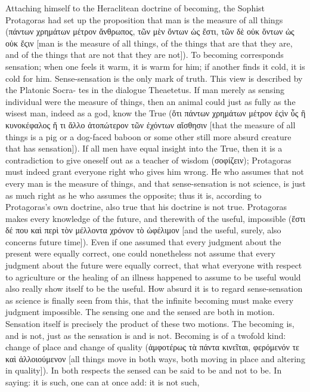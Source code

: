 \documentclass[12pt]{book}
\begin{document}
Attaching himself to the Heraclitean doctrine of becoming, the Sophist Protagoras had set up the
proposition that man is the measure of all things (πάντων χρημάτων μέτρον ἄνθρωπος, τῶν μὲν ὄντων ὡς
ἔστι, τῶν δὲ οὐκ ὄντων ὡς οὐκ ἔϛιν [man is the measure of all things, of the things that are that
they are, and of the things that are not that they are not]). To becoming corresponds sensation; when
one feels it warm, it is warm for him; if another finds it cold, it is cold for him. Sense-sensation
is the only mark of truth. This view is described by the Platonic Socra-
tes in the dialogue Theaetetus. If man merely as sensing individual were the measure of things, then
an animal could just
as fully as the wisest man, indeed as a god, know the True (ὅτι πάντων χρημάτων μέτρον ἐϛὶν ὗς ἢ
κυνοκέφαλος ἤ τι ἄλλο ἀτοπώτερον τῶν ἐχόντων αἴσθησιν [that the measure of all things is a pig or a
dog-faced baboon or some other still more absurd creature that has sensation]). If all men have equal
insight into the True, then it is a contradiction to give oneself out as a teacher of wisdom
(σοφίζειν); Protagoras must indeed grant everyone right who gives him wrong. He who assumes that not
every man is the measure of things, and that sense-sensation is not science, is just as much right as
he who assumes the opposite; thus it is, according to Protagoras's own doctrine, also true that his
doctrine is not true. Protagoras makes every knowledge of the future, and therewith of the useful,
impossible (ἔστι δέ που καὶ περὶ τὸν μέλλοντα χρόνον τὸ ὠφέλιμον [and the useful, surely, also
concerns future time]). Even if one assumed that every judgment about the present were equally
correct, one could nonetheless not assume that every judgment about the future were equally correct,
that what everyone with respect to agriculture or the healing of an illness happened to assume to be
useful would also really show itself to be the useful. How absurd it is to regard sense-sensation as
science is finally seen from this, that the infinite becoming must make every judgment impossible. The
sensing one and the sensed are both in motion. Sensation itself is precisely the product of these two
motions. The becoming is, and is not, just as the sensation is and is not. Becoming is of a twofold
kind: change of place and change of quality (ἀμφοτέρως τὰ πάντα κινεῖται, φερόμενόν τε καὶ ἀλλοιούμενον
[all things move in both ways, both moving in place and altering in quality]). In both respects the
sensed can be said to be and not to be. In saying: it is such, one can at once add: it is not such,
\end{document}
